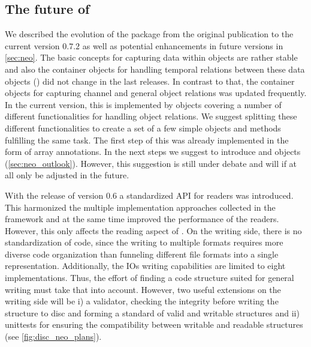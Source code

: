 \subsection{The future of }
We described the evolution of the  package from the original publication \cite{Garcia_2014} to the current version $0.7.2$ as well as potential enhancements in future versions in \cref{sec:neo}. The basic concepts for capturing data within  objects are rather stable and also the  container objects for handling temporal relations between these data objects () did not change in the last releases. In contrast to that, the container objects for capturing channel and general object relations was updated frequently. In the current  version, this is implemented by  objects covering a number of different functionalities for handling object relations. We suggest splitting these different functionalities to create a set of a few simple objects and methods fulfilling the same task. The first step of this was already implemented in the form of array annotations. In the next steps we suggest to introduce  and  objects (\cref{sec:neo_outlook}). However, this suggestion is still under debate and will if at all only be adjusted in the future. 

With the release of  version $0.6$ a standardized API for readers was introduced. This harmonized the multiple implementation approaches collected in the  framework and at the same time improved the performance of the readers. However, this only affects the reading aspect of . On the writing side, there is no standardization of code, since the writing to multiple formats requires more diverse code organization than funneling different file formats into a single representation. Additionally,  the IOs writing capabilities are limited to eight implementations.  Thus, the effort of finding a code structure suited for general writing must take that into account. However, two useful extensions on the writing side will be i) a validator, checking the integrity before writing the  structure to disc and forming a standard of valid and writable  structures and ii) unittests for ensuring the compatibility between writable and readable  structures (see \cref{fig:disc_neo_plans}).

